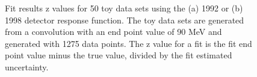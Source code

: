 \begin{figure}[h]
  \centering
  \hfill
  \caption{Fit results z values for 50 toy data sets using the (a) 1992 or (b) 1998 detector response function.
    The toy data sets are generated from a convolution with an end point value of 90 MeV and generated
    with 1275 data points. The z value for a fit is the fit end point value minus the true value, divided
    by the fit estimated uncertainty. 
  }
  \label{fig:ToyFitZs}
\end{figure}





